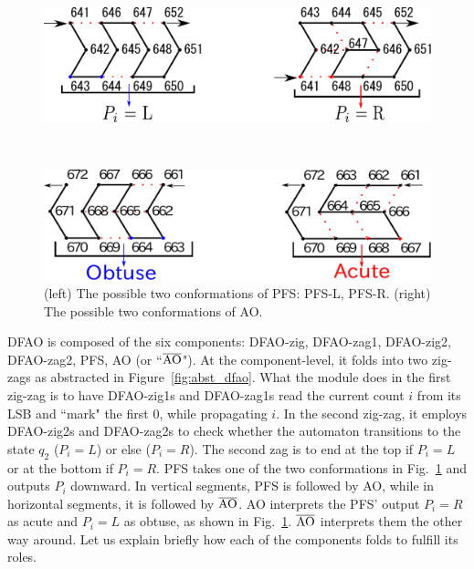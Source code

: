 \begin{figure}[h]
\centering
\begin{minipage}{0.4\hsize}
\includegraphics[width=\linewidth]{pic/Pi.pdf}

\end{minipage}
\begin{minipage}{0.1\hsize}
\ \\
\end{minipage}
\begin{minipage}{0.4\hsize}
\includegraphics[width=\linewidth]{pic/AO.pdf}

\end{minipage}  
\caption{(left) The possible two conformations of PFS: PFS-L, PFS-R. (right) The possible two conformations of AO.}
\label{fig:PFS}
\end{figure}



DFAO is composed of the six components: DFAO-zig, DFAO-zag1, DFAO-zig2, DFAO-zag2, PFS, AO (or  ``$\overline{\rm AO}$").
At the component-level, it folds into two zig-zags as abstracted in Figure~\ref{fig:abst_dfao}.
What the module does in the first zig-zag is to have DFAO-zig1s and DFAO-zag1s read the current count $i$ from its LSB and ``mark" the first 0, while propagating $i$.
In the second zig-zag, it employs DFAO-zig2s and DFAO-zag2s to check whether the automaton transitions to the state $q_2$ ($P_i = L$) or else ($P_i = R$).
The second zag is to end at the top if $P_i = L$ or at the bottom if $P_i = R$.
PFS takes one of the two conformations in Fig.~\ref{fig:PFS} and outputs $P_i$ downward.
In vertical segments, PFS is followed by AO, while in horizontal segments, it is followed by $\overline{\rm AO}$.
AO interprets the PFS' output $P_i = R$ as acute and $P_i = L$ as obtuse, as shown in Fig.~\ref{fig:PFS}.
$\overline{\rm AO}$ interprets them the other way around.
Let us explain briefly how each of the components folds to fulfill its roles.

